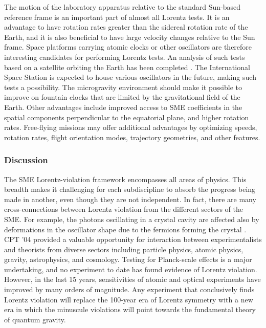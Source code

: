 \documentclass[twocolumn]{revtex4}
\begin{document}
The motion of the laboratory apparatus
relative to the standard Sun-based reference frame
is an important part of almost all Lorentz tests.
It is an advantage to have rotation rates
greater than the sidereal rotation rate of the Earth,
and it is also beneficial to have large velocity changes
relative to the Sun frame.
Space platforms carrying atomic clocks
or other oscillators are therefore interesting
candidates for performing Lorentz tests.
An analysis of such tests based on a satellite orbiting
the Earth has been completed \cite{spaceth}.
The International Space Station
is expected to house various oscillators in the future,
making such tests a possibility.
The microgravity environment
should make it possible to improve on fountain
clocks that are limited by the gravitational
field of the Earth.
Other advantages include
improved access to SME coefficients
in the spatial components perpendicular to the equatorial plane,
and higher rotation rates.
Free-flying missions may offer additional advantages
by optimizing
speeds,
rotation rates,
flight orientation modes,
trajectory geometries,
and other features.

\subsubsection{Discussion}
The SME Lorentz-violation framework encompasses all areas of physics.
This breadth makes it challenging for each subdiscipline
to absorb the progress being made in another,
even though they are not independent.
In fact,
there are many cross-connections between Lorentz violation
from the different sectors of the SME.
For example,
the photons oscillating in a crystal cavity
are affected also by deformations in the oscillator shape
due to the fermions forming the crystal \cite{muller2}.
CPT '04 provided a valuable opportunity
for interaction between
experimentalists and theorists
from diverse sectors including
particle physics,
atomic physics,
gravity,
astrophysics,
and cosmology.
Testing for Planck-scale effects
is a major undertaking,
and no experiment to date
has found evidence of Lorentz violation.
However,
in the last 15 years,
sensitivities of atomic and optical experiments
have improved by many orders of magnitude.
Any experiment that conclusively finds Lorentz violation
will replace the 100-year era of Lorentz symmetry
with a new era in which the minuscule violations
will point towards the fundamental
theory of quantum gravity.
\end{document}
